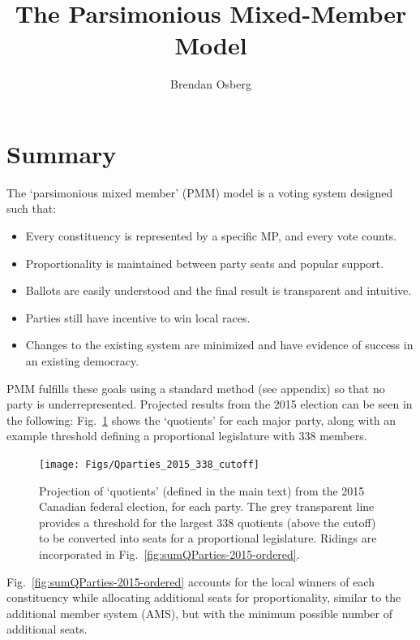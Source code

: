 \documentclass[DIV=calc, paper=a4, fontsize=11pt, twocolumn]{scrartcl}	 %
\title{The Parsimonious Mixed-Member Model} %
\author{Brendan Osberg} %
\date{} %
\begin{document}
\thispagestyle{fancy} %

\section*{Summary}
\renewcommand{\thefigure}{S-\arabic{figure}}

The `parsimonious mixed member' (PMM) model is a voting system designed such that:

\begin{itemize}
\item Every constituency is represented by a specific MP, and every vote counts. 
\item Proportionality is maintained between party seats and popular support. 
\item Ballots are easily understood and the final result is transparent and intuitive.
\item Parties still have incentive to win local races.
\item Changes to the existing system are minimized and have evidence of success in an existing democracy.
\end{itemize}

PMM fulfills these goals using a standard method (see appendix) so that no party is underrepresented. Projected results from the 2015 election can be seen in the following: Fig.~\ref{fig:sumQParties-2015-338-cutoff} shows the `quotients' for each major party, along with an example threshold defining a proportional legislature with 338 members. 
\begin{figure}[h!]
  \texttt{[image: Figs/Qparties\_2015\_338\_cutoff]}
  \caption{Projection of `quotients' (defined in the main text) from the 2015 Canadian federal election, for each party. The grey transparent line provides a threshold for the largest 338 quotients (above the cutoff) to be converted into seats for a proportional legislature. Ridings are incorporated in Fig.~\ref{fig:sumQParties-2015-ordered}. }
\label{fig:sumQParties-2015-338-cutoff}
\end{figure}

Fig.~\ref{fig:sumQParties-2015-ordered} accounts for the local winners of each constituency while allocating additional seats for proportionality, similar to the additional member system (AMS), but with the minimum possible number of additional seats.
\end{document}
